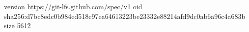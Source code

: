 version https://git-lfs.github.com/spec/v1
oid sha256:d7bc8edc0b984ed518c97ea64613223be23332e88214afd9dc0ab6a96c4a683b
size 5612
